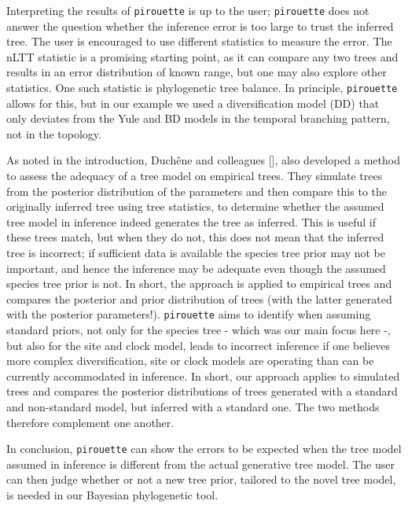 Interpreting the results of \verb;pirouette; is up to the user; 
\verb;pirouette; does not answer the question 
whether the inference error is too large to trust the inferred tree. The user is encouraged to use different statistics to measure the error. The nLTT statistic is
a promising starting point, as it can compare any two trees and 
results in an error distribution of known range, but one may also explore other statistics. One such statistic is phylogenetic tree balance. In principle,
\verb;pirouette; allows for this, but in our example we used a diversification model (DD) that only deviates from the Yule and BD models in the temporal branching pattern, not in the topology.

As noted in the introduction, Duch\^{e}ne and colleagues [\cite{duchene2018phylodynamic}],
also developed a method to assess the adequacy of a tree model
on empirical trees. They simulate trees from the posterior distribution of the parameters and then compare this to the originally inferred tree using tree statistics, to determine whether the assumed tree model in inference indeed generates the tree as inferred. This is useful if these trees match, but when they do not, this does not mean that the inferred tree is incorrect; if sufficient data is available the species tree prior may not be important, and hence the inference may be adequate even though the assumed species tree prior is not. In short, the approach is applied to empirical trees and compares the posterior and prior distribution of trees (with the latter generated with the posterior parameters!).
\verb;pirouette; aims to identify when assuming standard priors, not only for the species tree - which was our main focus here -, but also for the site and clock model, leads to incorrect inference if one believes more complex diversification, site or clock models are operating than can be currently accommodated in inference. In short, our approach applies to simulated trees and compares the posterior distributions of trees generated with a standard and non-standard model, but inferred with a standard one. The two methods therefore complement one another.

In conclusion, \verb;pirouette; can show the errors to be expected
when the tree model assumed in inference is different from the 
actual generative tree model.
The user can then judge whether or not a new tree prior, 
tailored to the novel tree model, is needed in our Bayesian phylogenetic tool. 

